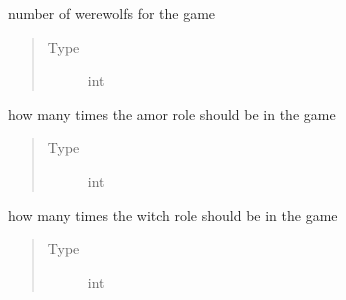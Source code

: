 \documentclass[letterpaper,10pt,english]{sphinxmanual}
\begin{document}
\begin{fulllineitems}
\begin{fulllineitems}
\end{fulllineitems}


\begin{fulllineitems}
\label{\detokenize{chatwolf:chatwolf.game.Game.num_werewolfs}}
number of werewolfs for the game
\begin{quote}\begin{description}
\item[{Type}] \leavevmode
int

\end{description}\end{quote}

\end{fulllineitems}


\begin{fulllineitems}
\label{\detokenize{chatwolf:chatwolf.game.Game.num_amor}}
how many times the amor role should be in the game
\begin{quote}\begin{description}
\item[{Type}] \leavevmode
int

\end{description}\end{quote}

\end{fulllineitems}


\begin{fulllineitems}
\label{\detokenize{chatwolf:chatwolf.game.Game.num_witch}}
how many times the witch role should be in the game
\begin{quote}\begin{description}
\item[{Type}] \leavevmode
int

\end{description}\end{quote}

\end{fulllineitems}


\end{fulllineitems}
\end{document}
